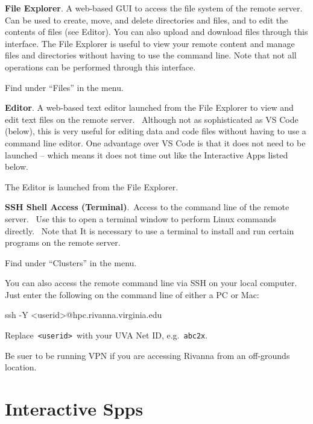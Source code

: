 \documentclass[
  letterpaper,
  DIV=11,
  numbers=noendperiod]{scrreport}
\newenvironment{Shaded}{\begin{snugshade}}{\end{snugshade}}
\newcommand{\AttributeTok}[1]{\textcolor[rgb]{0.40,0.45,0.13}{#1}}
\newcommand{\FunctionTok}[1]{\textcolor[rgb]{0.28,0.35,0.67}{#1}}
\newcommand{\NormalTok}[1]{\textcolor[rgb]{0.00,0.23,0.31}{#1}}
\newcommand{\OperatorTok}[1]{\textcolor[rgb]{0.37,0.37,0.37}{#1}}
\begin{document}
\textbf{File Explorer}. A web-based GUI to access the file system of the
remote server. Can be used to create, move, and delete directories and
files, and to edit the contents of files (see Editor). You can also
upload and download files through this interface. The File Explorer is
useful to view your remote content and manage files and directories
without having to use the command line. Note that not all operations can
be performed through this interface.

Find under ``Files'' in the menu.~

\textbf{Editor}. A web-based text editor launched from the File Explorer
to view and edit text files on the remote server.~ Although not as
sophisticated as VS Code (below), this is very useful for editing data
and code files without having to use a command line editor. One
advantage over VS Code is that it does not need to be launched -- which
means it does not time out like the Interactive Apps listed below.

The Editor is launched from the File Explorer.

\textbf{SSH Shell Access (Terminal)}.~Access to the command line of the
remote server.~ Use this to open a terminal window to perform Linux
commands directly.~ Note that It is necessary to use a terminal to
install and run certain programs on the remote server.

Find under ``Clusters'' in the menu.~

You can also access the remote command line via SSH on your local
computer. Just enter the following on the command line of either a PC or
Mac:

\begin{Shaded}
\begin{Highlighting}[]
\FunctionTok{ssh} \AttributeTok{{-}Y} \OperatorTok{\textless{}}\NormalTok{userid}\OperatorTok{\textgreater{}}\NormalTok{@hpc.rivanna.virginia.edu}
\end{Highlighting}
\end{Shaded}

Replace~\texttt{\textless{}userid\textgreater{}}~with your UVA Net ID,
e.g.~\texttt{abc2x}.~

Be suer to be running VPN if you are accessing Rivanna from an
off-grounds location.

\hypertarget{interactive-spps}{%
\section{Interactive Spps}\label{interactive-spps}}
\end{document}
